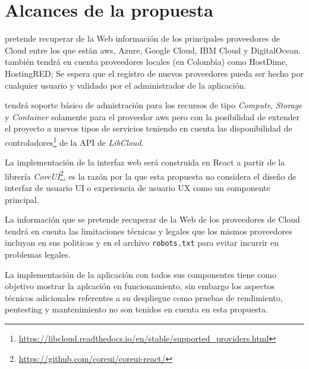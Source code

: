 \chapter{Alcances de la propuesta} %

\label{ch:alcances} %



\appName pretende recuperar de la Web información de los principales proveedores de Cloud entre los que están \acs{aws}, \acs{Azure}, \acs{Google Cloud}, \acs{IBM Cloud} y \acs{DigitalOcean}. \appName también tendrá en cuenta proveedores locales (en Colombia) como \acs{HostDime}, \acs{HostingRED}; Se espera que el registro de nuevos proveedores pueda ser hecho por cualquier usuario y validado por el administrador de la aplicación.\bigskip

\appName tendrá soporte básico de admistración para los recursos de tipo \textit{Compute}, \textit{Storage} y \textit{Container} solamente para el proveedor \acs{aws} pero con la posibilidad de extender el proyecto a nuevos tipos de servicios teniendo en cuenta las disponibilidad de controladores\footnote{\url{https://libcloud.readthedocs.io/en/stable/supported_providers.html}} de la API de \textit{LibCloud}. \bigskip

La implementación de la interfaz web será construida en \acs{React} a partir de la librería \textit{CoreUI}\footnote{\url{https://github.com/coreui/coreui-react/}}, es la razón por la que esta propuesta no considera el diseño de interfaz de usuario \acs{UI} o experiencia de usuario \acs{UX} como un componente principal.\bigskip

La información que se pretende recuperar de la Web de los proveedores de Cloud tendrá en cuenta las limitaciones técnicas y legales que los mismos proveedores incluyan en sus politicas y en el archivo \texttt{robots.txt} para evitar incurrir en problemas legales. \bigskip

La implementación de la aplicación con todos sus componentes tiene como objetivo mostrar la aplcación en funcionamiento, sin embargo los aspectos técnicos adicionales referentes a su despliegue como pruebas de rendimiento, pentesting y mantenimiento no son tenidos en cuenta en esta propuesta.